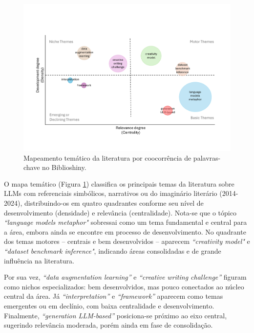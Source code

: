 \documentclass[portuguese]{textolivre}
\begin{document}
\begin{figure}[htbp]
\centering
\begin{minipage}{0.90\textwidth}
\includegraphics[width=\textwidth]{Imagens/fig-002.pdf}
\caption{Mapeamento temático da literatura por coocorrência de palavras-chave no Biblioshiny.}
\label{fig-2}
\end{minipage}
\end{figure}

O mapa temático (Figura \ref{fig-2}) classifica os principais temas da literatura sobre LLMs com referenciais simbólicos, narrativos ou do imaginário literário (2014-2024), distribuindo-os em quatro quadrantes conforme seu nível de desenvolvimento (densidade) e relevância (centralidade). Nota-se que o tópico \textit{``language models metaphor"} sobressai como um tema fundamental e central para a área, embora ainda se encontre em processo de desenvolvimento. No quadrante dos temas motores -- centrais e bem desenvolvidos -- aparecem \textit{``creativity model"} e \textit{``dataset benchmark inference"}, indicando áreas consolidadas e de grande influência na literatura.

Por sua vez, \textit{“data augmentation learning”} e \textit{“creative writing challenge”} figuram como nichos especializados: bem desenvolvidos, mas pouco conectados ao núcleo central da área. Já \textit{“interpretation”} e \textit{“framework”} aparecem como temas emergentes ou em declínio, com baixa centralidade e desenvolvimento. Finalmente, \textit{“generation LLM-based”} posiciona-se próximo ao eixo central, sugerindo relevância moderada, porém ainda em fase de consolidação.
\end{document}
